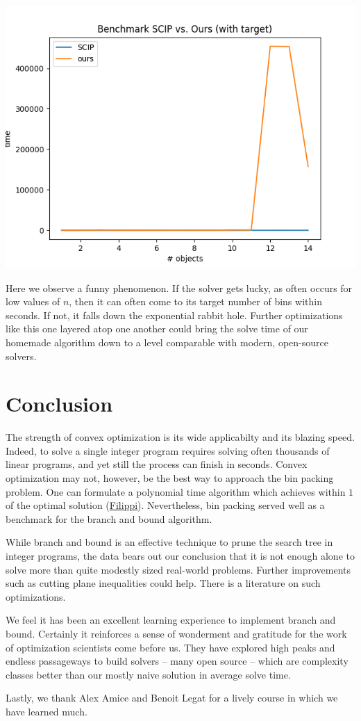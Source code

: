 \documentclass{article}
\begin{document}
\begin{center}
    \includegraphics[scale=0.5]{benchmark_yes_target}
\end{center}

Here we observe a funny phenomenon. If the solver gets lucky, as often occurs for low values of $n$, then it can often come to its target number of bins within seconds. If not, it falls down the exponential rabbit hole. Further optimizations like this one layered atop one another could bring the solve time of our homemade algorithm down to a level comparable with modern, open-source solvers.

\section{Conclusion}

The strength of convex optimization is its wide applicabilty and its blazing speed. Indeed, to solve a single integer program requires solving often thousands of linear programs, and yet still the process can finish in seconds. Convex optimization may not, however, be the best way to approach the bin packing problem. One can formulate a polynomial time algorithm which achieves within $1$ of the optimal solution (\href{sciencedirect.com/science/article/abs/pii/S0377221706004310?via\%3Dihub}{Filippi}). Nevertheless, bin packing served well as a benchmark for the branch and bound algorithm.

While branch and bound is an effective technique to prune the search tree in integer programs, the data bears out our conclusion that it is not enough alone to solve more than quite modestly sized real-world problems. Further improvements such as cutting plane inequalities could help. There is a literature on such optimizations.

We feel it has been an excellent learning experience to implement branch and bound. Certainly it reinforces a sense of wonderment and gratitude for the work of optimization scientists come before us. They have explored high peaks and endless passageways to build solvers -- many open source -- which are complexity classes better than our mostly naive solution in average solve time.

Lastly, we thank Alex Amice and Benoit Legat for a lively course in which we have learned much.
\end{document}
